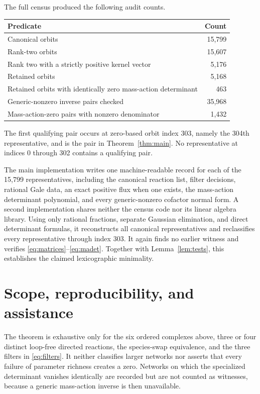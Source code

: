 \documentclass[11pt]{article}
\begin{document}
The full census produced the following audit counts.
\begin{center}
\small
\begin{tabular}{@{}p{}r@{}}
\toprule
Predicate & Count\\
\midrule
Canonical orbits & 15,799\\
Rank-two orbits & 15,607\\
Rank two with a strictly positive kernel vector & 5,176\\
Retained orbits & 5,168\\
Retained orbits with identically zero mass-action determinant & 463\\
Generic-nonzero inverse pairs checked & 35,968\\
Mass-action-zero pairs with nonzero denominator & 1,432\\
\bottomrule
\end{tabular}
\end{center}
The first qualifying pair occurs at zero-based orbit index 303, namely the
304th representative, and is the pair in Theorem~\ref{thm:main}.  No
representative at indices 0 through 302 contains a qualifying pair.

The main implementation writes one machine-readable record for each of the
15,799 representatives, including the canonical reaction list, filter
decisions, rational Gale data, an exact positive flux when one exists, the
mass-action determinant polynomial, and every generic-nonzero cofactor normal
form.  A second implementation shares neither the census code nor its linear
algebra library.  Using only rational fractions, separate Gaussian
elimination, and direct determinant formulas, it reconstructs all canonical
representatives and reclassifies every representative through index 303.  It
again finds no earlier witness and verifies \eqref{eq:matrices}--\eqref{eq:madet}.
Together with Lemma~\ref{lem:tests}, this establishes the claimed
lexicographic minimality.

\section{Scope, reproducibility, and assistance}

The theorem is exhaustive only for the six ordered complexes above, three or
four distinct loop-free directed reactions, the species-swap equivalence, and
the three filters in \eqref{eq:filters}.  It neither classifies larger
networks nor asserts that every failure of parameter richness creates a zero.
Networks on which the specialized determinant vanishes identically are
recorded but are not counted as witnesses, because a generic mass-action
inverse is then unavailable.
\end{document}
